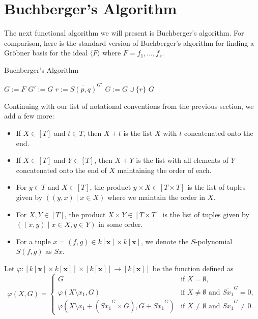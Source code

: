 \documentclass[MS, xcolor=dvipsnames]{wfuthesis}
\def\and{\text{ and }}
\theoremstyle{definition}
\def\p{\varphi}
\begin{document}

\section{Buchberger's Algorithm}
The next functional algorithm we will present is Buchberger's algorithm. For comparison, here is the standard version of Buchberger's algorithm for finding a Gr\"obner basis for the ideal $\langle F \rangle$ where $F = f_1,\dots,f_s$. \par
\begin{algorithm}
  \caption{Buchberger's Algorithm}
  \begin{algorithmic}
    \State $G:=F$
    \Repeat
      \State $G' := G$
        \State $r := \overline{S(p,q)}^{G'}$
          \State $G := G \cup \{r\}$
        \EndIf
      \EndFor
    \State \Return $G$
  \end{algorithmic}
\end{algorithm}
Continuing with our list of notational conventions from the previous section, we add a few more:
\begin{itemize}
  \item If $X \in [T]$ and $t \in T$, then $X + t$ is the list $X$ with $t$ concatenated onto the end.
  \item If $X \in [T]$ and $Y \in [T]$, then $X + Y$ is the list with all elements of $Y$ concatenated onto the end of $X$ maintaining the order of each.
  \item For $y \in T$ and $X \in [T]$, the product $y \times X \in [T \times T]$ is the list of tuples given by $((y,x) \mid x \in X)$ where we maintain the order in $X$.
  \item For $X,Y \in [T]$, the product $X \times Y \in [T \times T]$ is the list of tuples given by $((x,y) \mid x \in X, y \in Y)$ in some order.
  \item For a tuple $x = (f,g) \in k[\mathbf x] \times k[\mathbf x]$, we denote the $S$-polynomial $S(f,g)$ as $Sx$.
\end{itemize}
Let $\p: [k[\mathbf x] \times k[\mathbf x]] \times [k[\mathbf x]] \to [k[\mathbf x]]$ be the function defined as
\[ \p(X,G) = \begin{cases} G &\text{if } X = \emptyset, \\ \p(X \setminus x_1,G) &\text{if } X \ne \emptyset \and \overline{Sx_1}^{G} = 0, \\ \p\left(X \setminus x_1 + (\overline{Sx_1}^{G} \times G),G + \overline{Sx_1}^{G}\right) &\text{if } X \ne \emptyset \and \overline{Sx_1}^{G} \ne 0. \end{cases} \]
\end{document}
